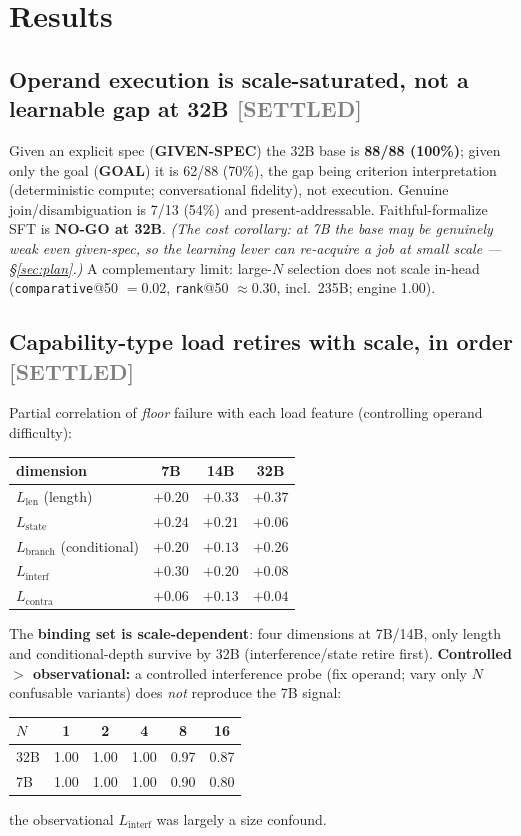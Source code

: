 \documentclass[10pt]{article}
\newcommand{\settled}{\textcolor{gray}{\small[SETTLED]}}
\begin{document}
\section{Results}
\subsection{Operand execution is scale-saturated, not a learnable gap at 32B \settled}\label{sec:operand}
Given an explicit spec (\textbf{GIVEN-SPEC}) the 32B base is \textbf{88/88 (100\%)}; given only the goal (\textbf{GOAL}) it is 62/88 (70\%), the gap being criterion interpretation (deterministic compute; conversational fidelity), not execution. Genuine join/disambiguation is 7/13 (54\%) and present-addressable. Faithful-formalize SFT is \textbf{NO-GO at 32B}. \emph{(The cost corollary: at 7B the base may be genuinely weak even given-spec, so the learning lever can re-acquire a job at small scale --- \S\ref{sec:plan}.)} A complementary limit: large-$N$ selection does not scale in-head (\texttt{comparative}@50 $=0.02$, \texttt{rank}@50 $\approx0.30$, incl.\ 235B; engine 1.00).

\subsection{Capability-type load retires with scale, in order \settled}\label{sec:load}
Partial correlation of \emph{floor} failure with each load feature (controlling operand difficulty):
\begin{center}\small\begin{tabular}{lccc}
\toprule dimension & 7B & 14B & 32B \\ \midrule
$L_{\mathrm{len}}$ (length) & $+0.20$ & $+0.33$ & $\mathbf{+0.37}$ \\
$L_{\mathrm{state}}$ & $\mathbf{+0.24}$ & $\mathbf{+0.21}$ & $+0.06$ \\
$L_{\mathrm{branch}}$ (conditional) & $+0.20$ & $+0.13$ & $\mathbf{+0.26}$ \\
$L_{\mathrm{interf}}$ & $\mathbf{+0.30}$ & $\mathbf{+0.20}$ & $+0.08$ \\
$L_{\mathrm{contra}}$ & $+0.06$ & $+0.13$ & $+0.04$ \\ \bottomrule
\end{tabular}\end{center}
The \textbf{binding set is scale-dependent}: four dimensions at 7B/14B, only length and conditional-depth survive by 32B (interference/state retire first). \textbf{Controlled $>$ observational:} a controlled interference probe (fix operand; vary only $N$ confusable variants) does \emph{not} reproduce the 7B signal:
\begin{center}\small\begin{tabular}{lccccc}
\toprule $N$ & 1 & 2 & 4 & 8 & 16 \\ \midrule
32B & 1.00 & 1.00 & 1.00 & 0.97 & 0.87 \\
7B  & 1.00 & 1.00 & 1.00 & 0.90 & 0.80 \\ \bottomrule
\end{tabular}\end{center}
the observational $L_{\mathrm{interf}}$ was largely a size confound.
\end{document}
